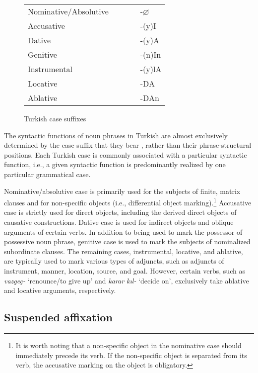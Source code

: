 \begin{figure}[!h]
\centering
\begin{tabular}{lllll}
		Nominative/Absolutive & & & & -$\varnothing$ \\
		Accusative 			& & & & -(y)I    \\
		Dative     			& & & & -(y)A    \\
		Genitive   			& & & & -(n)In   \\
		Instrumental		& & & & -(y)lA   \\
		Locative   			& & & & -DA      \\
		Ablative   			& & & & -DAn 	 \\
 
	\end{tabular}
\caption{Turkish case suffixes}
\label{tr_case_suffix}
\end{figure}

The syntactic functions of noun phrases in Turkish are almost exclusively determined by the case suffix that they bear \citep[p.\ 212]{kornfilt97}, rather than their phrase-structural positions. Each Turkish case is commonly associated with a particular syntactic function, i.e., a given syntactic function is predominantly realized by one particular grammatical case. 

Nominative/absolutive case is primarily used for the subjects of finite, matrix clauses and for non-specific objects (i.e., differential object marking).\footnote{It is worth noting that a non-specific object in the nominative case should immediately precede its verb. If the non-specific object is separated from its verb, the accusative marking on the object is obligatory.} Accusative case is strictly used for direct objects, including the derived direct objects of causative constructions. Dative case is used for indirect objects and oblique arguments of certain verbs. In addition to being used to mark the possessor of possessive noun phrase, genitive case is used to mark the subjects of nominalized subordinate clauses. The remaining cases, instrumental, locative, and ablative, are typically used to mark various types of adjuncts, such as adjuncts of instrument, manner, location, source, and goal. However, certain verbs, such as \textit{vazgeç-} `renounce/to give up' and \textit{karar kıl-} `decide on', exclusively take ablative and locative arguments, respectively.

\subsection{Suspended affixation} 

